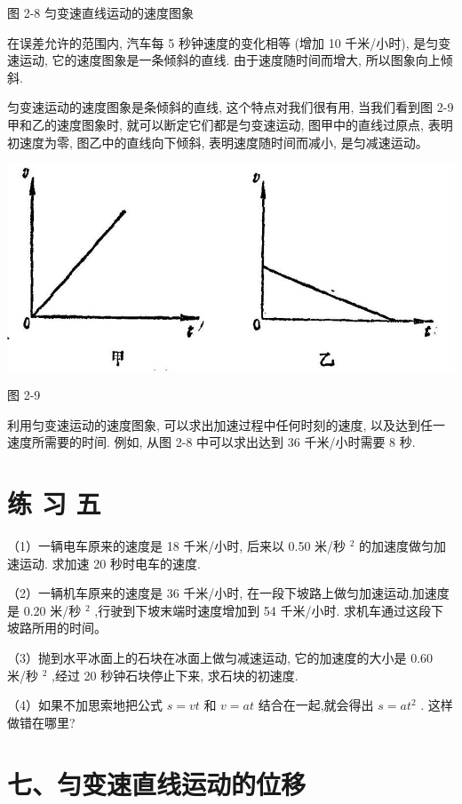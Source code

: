 \documentclass[10pt]{article}
\begin{document}
图 2-8 匀变速直线运动的速度图象

在误差允许的范围内, 汽车每 5 秒钟速度的变化相等 (增加 10 千米/小时), 是匀变速运动, 它的速度图象是一条倾斜的直线. 由于速度随时间而增大, 所以图象向上倾斜.

匀变速运动的速度图象是条倾斜的直线, 这个特点对我们很有用, 当我们看到图 2-9 甲和乙的速度图象时, 就可以断定它们都是匀变速运动, 图甲中的直线过原点, 表明初速度为零, 图乙中的直线向下倾斜, 表明速度随时间而减小, 是匀减速运动。

\begin{center}
\includegraphics[max width=1.0\textwidth]{images/01912d55-147c-70aa-b0e0-1782a122f948_72_699468.jpg}
\end{center}

图 2-9

利用匀变速运动的速度图象, 可以求出加速过程中任何时刻的速度, 以及达到任一速度所需要的时间. 例如, 从图 2-8 中可以求出达到 36 千米/小时需要 8 秒.

\section*{练 习 五}

（1）一辆电车原来的速度是 18 千米/小时, 后来以 0.50 米/秒 \({}^{2}\) 的加速度做匀加速运动. 求加速 20 秒时电车的速度.

（2）一辆机车原来的速度是 36 千米/小时, 在一段下坡路上做匀加速运动,加速度是 0.20 米/秒 \({}^{2}\) ,行驶到下坡末端时速度增加到 54 千米/小时. 求机车通过这段下坡路所用的时间。

（3）抛到水平冰面上的石块在冰面上做匀减速运动, 它的加速度的大小是 0.60 米/秒 \({}^{2}\) ,经过 20 秒钟石块停止下来, 求石块的初速度.

（4）如果不加思索地把公式 \(s = {vt}\) 和 \(v = {at}\) 结合在一起,就会得出 \(s = a{t}^{2}\) . 这样做错在哪里?

\section*{七、匀变速直线运动的位移}
\end{document}
